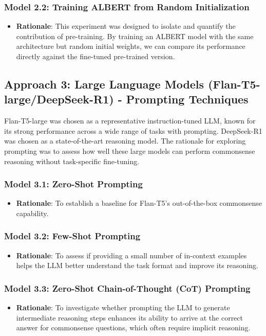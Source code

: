 \documentclass[10.5pt]{article}
\begin{document}
\subsubsection{Model 2.2: Training ALBERT from Random Initialization}
\begin{itemize}
    \item \textbf{Rationale}: This experiment was designed to isolate and quantify the contribution of pre-training. By training an ALBERT model with the same architecture but random initial weights, we can compare its performance directly against the fine-tuned pre-trained version.
\end{itemize}

\subsection{Approach 3: Large Language Models (Flan-T5-large/DeepSeek-R1) - Prompting Techniques}
Flan-T5-large was chosen as a representative instruction-tuned LLM, known for its strong performance across a wide range of tasks with prompting.  DeepSeek-R1 was chosen as a state-of-the-art reasoning model. The rationale for exploring prompting was to assess how well these large models can perform commonsense reasoning without task-specific fine-tuning.
\subsubsection{Model 3.1: Zero-Shot Prompting}
\begin{itemize}
    \item \textbf{Rationale}: To establish a baseline for Flan-T5's out-of-the-box commonsense capability.
\end{itemize}
\subsubsection{Model 3.2: Few-Shot Prompting}
\begin{itemize}
    \item \textbf{Rationale}: To assess if providing a small number of in-context examples helps the LLM better understand the task format and improve its reasoning.
\end{itemize}
\subsubsection{Model 3.3: Zero-Shot Chain-of-Thought (CoT) Prompting}
\begin{itemize}
    \item \textbf{Rationale}: To investigate whether prompting the LLM to generate intermediate reasoning steps enhances its ability to arrive at the correct answer for commonsense questions, which often require implicit reasoning.
\end{itemize}
\end{document}
